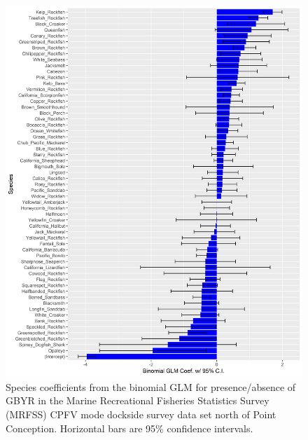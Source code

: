 \documentclass[12pt,]{article}
\begin{document}
\FloatBarrier

\begin{figure}
\centering
\includegraphics{Figures/Fleet11_SM_filter.png}
\caption{Species coefficients from the binomial GLM for presence/absence
of GBYR in the Marine Recreational Fisheries Statistics Survey (MRFSS)
CPFV mode dockside survey data set north of Point Conception. Horizontal
bars are 95\% confidence intervals. \label{fig:Fleet11_SM_filter}}
\end{figure}

\FloatBarrier
\end{document}
